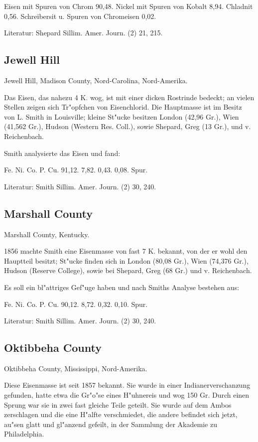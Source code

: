 \documentclass[a4paper, 11pt, oneside]{article}
\begin{document}
Eisen mit Spuren von Chrom 90,48.  
Nickel mit Spuren von Kobalt 8,94.  
Chladnit 0,56.  
Schreibersit u. Spuren von Chromeisen 0,02.

Literatur: Shepard Sillim. Amer. Journ. (2) 21, 215.

\subsection{Jewell Hill}

Jewell Hill, Madison County, Nord-Carolina, Nord-Amerika.

Das Eisen, das nahezu 4 K. wog, ist mit einer dicken Rostrinde bedeckt; an vielen Stellen zeigen sich Tr"opfchen von Eisenchlorid. Die Hauptmasse ist im Besitz von L. Smith in Louisville; kleine St"ucke besitzen London (42,96 Gr.), Wien (41,562 Gr.), Hudson (Western Res. Coll.), sowie Shepard, Greg (13 Gr.), und v. Reichenbach.

Smith analysierte das Eisen und fand:

Fe. Ni. Co. P. Cu.  
91,12. 7,82. 0,43. 0,08. Spur.

Literatur: Smith Sillim. Amer. Journ. (2) 30, 240.

\subsection{Marshall County}

Marshall County, Kentucky.

1856 machte Smith eine Eisenmasse von fast 7 K. bekannt, von der er wohl den Hauptteil besitzt; St"ucke finden sich in London (80,08 Gr.), Wien (74,376 Gr.), Hudson (Reserve College), sowie bei Shepard, Greg (68 Gr.) und v. Reichenbach.

Es soll ein bl"attriges Gef"uge haben und nach Smiths Analyse bestehen aus:

Fe. Ni. Co. P. Cu.  
90,12. 8,72. 0,32. 0,10. Spur.  

Literatur: Smith Sillim. Amer. Journ. (2) 30, 240.

\subsection{Oktibbeha County}

Oktibbeha County, Mississippi, Nord-Amerika.

Diese Eisenmasse ist seit 1857 bekannt. Sie wurde in einer Indianerverschanzung gefunden, hatte etwa die Gr"o"se eines H"uhnereis und wog 150 Gr. Durch einen Sprung war sie in zwei fast gleiche Teile geteilt. Sie wurde auf dem Ambos zerschlagen und die eine H"alfte verschmiedet, die andere befindet sich jetzt, au"sen glatt und gl"anzend gefeilt, in der Sammlung der Akademie zu Philadelphia.
\end{document}
